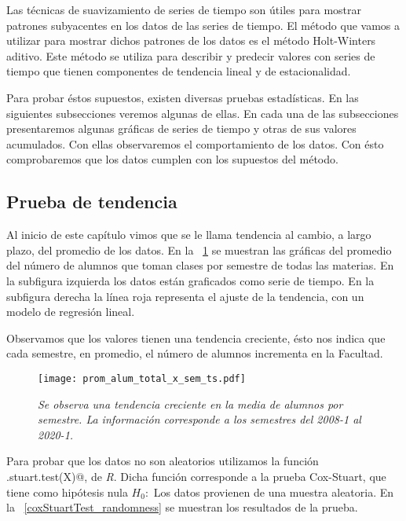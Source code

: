Las técnicas de suavizamiento de series de tiempo son útiles para mostrar patrones subyacentes en los datos de las series de tiempo. El método que vamos a utilizar para mostrar dichos patrones de los datos es el método Holt-Winters aditivo. Este método se utiliza para describir y predecir valores con series de tiempo que tienen componentes de tendencia lineal y de estacionalidad.

Para probar éstos supuestos, existen diversas pruebas estadísticas. En las siguientes subsecciones veremos algunas de ellas. En cada una de las subsecciones presentaremos algunas gráficas de series de tiempo y otras de sus valores acumulados. Con ellas observaremos el comportamiento de los datos. Con ésto comprobaremos que los datos cumplen con los supuestos del método.


\subsection{Prueba de tendencia}

Al inicio de este capítulo vimos que se le llama tendencia al cambio, a largo plazo, del promedio de los datos. En la \figurename{~\ref{prom_alum_x_sem_ts}} se muestran las gráficas del promedio del número de alumnos que toman clases por semestre de todas las materias. En la subfigura izquierda los datos están graficados como serie de tiempo. En la subfigura derecha la línea roja representa el ajuste de la tendencia, con un modelo de regresión lineal.

Observamos que los valores tienen una tendencia creciente, ésto nos indica que cada semestre, en promedio, el número de alumnos incrementa en la Facultad.

\begin{figure}[H]
\centering
\texttt{[image: prom\_alum\_total\_x\_sem\_ts.pdf]} %
\caption[\textit{Media de alumnos por semestre}]{\textit{Se observa una tendencia creciente en la media de alumnos por semestre. La información corresponde a los semestres del 2008-1 al 2020-1.}}\label{prom_alum_x_sem_ts}
\end{figure}

Para probar que los datos no son aleatorios utilizamos la función \verb@cox.stuart.test(X)@, de \textit{R}. Dicha función corresponde a la prueba Cox-Stuart, que tiene como hipótesis nula $H_{0}:$ Los datos provienen de una muestra aleatoria. En la \figurename{~\ref{coxStuartTest_randomness}} se muestran los resultados de la prueba.

